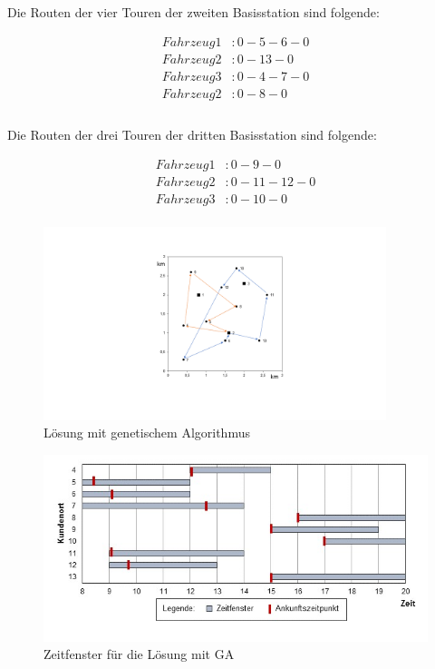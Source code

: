 \documentclass[a4paper,12pt,parskip,bibtotoc,liststotoc]{article}
\begin{document}
Die Routen der vier Touren der zweiten Basisstation sind folgende: 

\begin{equation} \label{eq:test}
    \begin{aligned} 
         Fahrzeug 1&: 0 - 5 - 6 - 0 \\
        Fahrzeug 2&: 0 - 13 - 0\\
        Fahrzeug 3&: 0 - 4 - 7 - 0\\
        Fahrzeug 2&: 0 - 8 - 0\\
    \end{aligned}
\end{equation}\\

Die Routen der drei Touren der dritten Basisstation sind folgende: 

\begin{equation} \label{eq:test}
    \begin{aligned} 
         Fahrzeug 1&: 0 - 9 - 0 \\
        Fahrzeug 2&: 0 - 11 - 12 - 0\\
         Fahrzeug 3&: 0 - 10 - 0\\
    \end{aligned}
\end{equation}



\begin{figure}[h!]
  \begin{center}
      \includegraphics[width=100mm]{vrp33a.png}
    \caption{Lösung mit genetischem Algorithmus}  \label{Typen}
  \end{center}
\end{figure}


\begin{figure}[h!]
  \begin{center}
    \includegraphics[width=150mm]{zf1.jpg}
    \caption{Zeitfenster für die Lösung mit GA}  \label{Typen}
  \end{center}
\end{figure}
\end{document}

